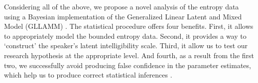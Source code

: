 Considering all of the above, we propose a novel analysis of the entropy data using a Bayesian implementation of the Generalized Linear Latent and Mixed Model (GLLAMM) \cite{Rabe_et_al_2004a, Rabe_et_al_2004b, Rabe_et_al_2004c, Rabe_et_al_2012, Skrondal_et_al_2004a}. The statistical procedure offers four benefits. First, it allows to appropriately model the bounded entropy data. Second, it provides a way to `construct' the speaker's latent intelligibility scale. Third, it allow us to test our research hypothesis at the appropriate level. And fourth, as a result from the first two, we successfully avoid producing false confidence in the parameter estimates, which help us to produce correct statistical inferences \cite{McElreath_2020}.

\begin{comment}
	
	The previous statistical method offers three specific benefits. On the one hand, it allow us to consider all of the data nuances at once, i.e. we can model our `non normal' data, and control for the different sources of variation (error) observed in it. The latter is particularly important because, as it was mentioned, by failing to account for these sources we could be `manufacturing' false confidence in the parameter estimates, leading us to incorrect inferences \cite{McElreath_2020}. On the other hand, the method provides a way to `construct' an intelligibility scale. This in turn, allow us to test our research hypotheses on the measure of interest, and even make individual comparisons at the children level. Finally, resulting from the statistical procedure sophistication, the method also provides a `criterion' on how reliable the repeated entropy measures are to quantify speech intelligibility.
	
	Second, we use Directed Acyclic Graph (DAG) \cite{Pearl_2009, Cinelli_et_al_2021} to depict all the relevant variables though to influence \textit{speech intelligibility}. We describe in detail our causal and non-causal hypothesis, and supplement our description with a causal diagram. The benefit of the method lies, not only, in that it makes the assumptions of our hypothesis more transparent, but also allow us to derive statistical procedures from our causal assumptions \cite{McElreath_2020, Yarkoni_2020, Rohrer_et_al_2021}.
	

\end{comment}
